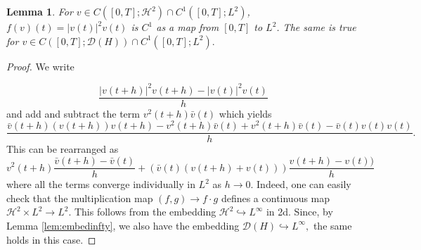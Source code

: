 \documentclass[11pt, oneside]{article}   	%
\newtheorem{lemma}[theorem]{Lemma}
\newcommand{\ssp}{\mathscr{H}}
\begin{document}
\begin{lemma} \label{fuderivative} For $v  \in C ([0, T] ;
	\ssp^2) \cap C^1 ([0, T] ; L^2)$,  $f(v)(t) = |v(t)|^2 v(t)$ is $C^1$ as a map from $[0,T]$ to $L^2$. The same is true for $v\in C([0,T];\mathscr{D}(H))\cap C^1 ([0, T] ; L^2).$
\end{lemma}
\begin{proof}
	We write
	
	\[
	\frac{|v(t+h)|^2v(t+h) - |v(t)|^2v(t) }{h} 
	\]
	and add and subtract the term $v^2(t+h)\bar v(t)$ which yields
	\[
	\frac{\bar{v}(t+h) (v(t+h))v(t+h) - v^2(t+h)\bar v(t) + v^2(t+h)\bar{v}(t) - \bar{v}(t) v(t)v(t) }{h}.
	\]
	This can  be rearranged as 
	\[
	{v}^2(t+h) \frac{\bar v(t+h) - \bar{v}(t)}{h} + \left(\bar{v}(t) (v(t+h) + v(t)) \right) \frac{v(t+h) - v(t))}{h} 
	\]
	where all the terms converge individually in $L^2$ as $h \rightarrow 0$. Indeed, one can easily check that the multiplication map $(f,g) \rightarrow f\cdot g$ defines a continuous map $\ssp^2 \times L^2 \rightarrow L^2$.  This follows from the embedding $\ssp^2\hookrightarrow L^\infty$ in 2d. Since, by Lemma \ref{lem:embedinfty}, we also have the embedding $\mathscr{D}(H)\hookrightarrow L^\infty,$ the same holds in this case. 
\end{proof}
\end{document}
